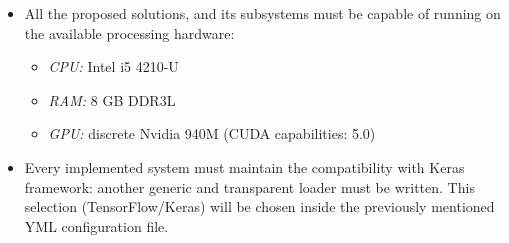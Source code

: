 \begin{itemize}
	\item All the proposed solutions, and its subsystems must be capable of running on the available processing hardware:
	\begin{itemize}
		\item \emph{CPU:} Intel i5 4210-U
		\item \emph{RAM:} 8 GB DDR3L
		\item \emph{GPU:} discrete Nvidia 940M (CUDA capabilities: 5.0)
	\end{itemize}
	
	\item Every implemented system must maintain the compatibility with Keras framework: another generic and transparent loader must be written. This selection (TensorFlow/Keras) will be chosen inside the previously mentioned YML configuration file.
\end{itemize}
